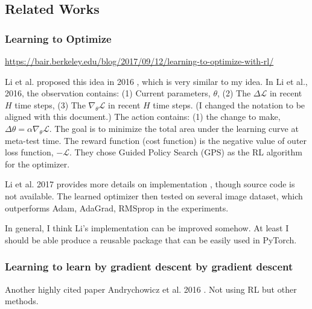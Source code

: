 \subsection{Related Works}
\subsubsection{Learning to Optimize}
\href{https://bair.berkeley.edu/blog/2017/09/12/learning-to-optimize-with-rl/}{https://bair.berkeley.edu/blog/2017/09/12/learning-to-optimize-with-rl/}

Li et al. proposed this idea in 2016 \cite{li2016learning}, which is very similar to my idea.
In Li et al., 2016, the observation contains: (1) Current parameters, $\theta$, (2) The $\Delta \mathcal{L}$ in recent $H$ time steps, (3) The $\nabla_{\theta} \mathcal{L}$ in recent $H$ time steps. (I changed the notation to be aligned with this document.)
The action contains: (1) the change to make, $\Delta \theta = \alpha \nabla_{\theta} \mathcal{L}$.
The goal is to minimize the total area under the learning curve at meta-test time.
The reward function (cost function) is the negative value of outer loss function, $- \mathcal{L}$.
They chose Guided Policy Search (GPS) as the RL algorithm for the optimizer.


Li et al. 2017 provides more details on implementation \cite{li2017learning}, though source code is not available.
The learned optimizer then tested on several image dataset, which outperforms Adam, AdaGrad, RMSprop in the experiments.

In general, I think Li's implementation can be improved somehow. 
At least I should be able produce a reusable package that can be easily used in PyTorch.

\subsubsection{Learning to learn by gradient descent by gradient descent}
Another highly cited paper Andrychowicz et al. 2016 \cite{andrychowicz2016learning}.
Not using RL but other methods.






